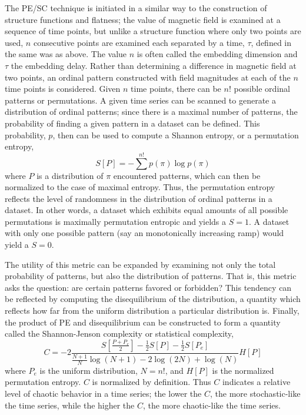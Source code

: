 \documentclass[aip,pop,amsmath,amssymb,preprint,superscriptaddress]{revtex4-1} %
\begin{document}
The PE/SC technique is initiated in a similar way to the construction of structure functions and flatness; the value of magnetic field is examined at a sequence of time points, but unlike a structure function where only two points are used, $n$ consecutive points are examined each separated by a time, $\tau$, defined in the same was as above. The value $n$ is often called the embedding dimension and $\tau$ the embedding delay. Rather than determining a difference in magnetic field at two points, an ordinal pattern constructed with field magnitudes at each of the $n$ time points is considered. Given $n$ time points, there can be $n!$ possible ordinal patterns or permutations. A given time series can be scanned to generate a distribution of ordinal patterns; since there is a maximal number of patterns, the probability of finding a given pattern in a dataset can be defined. This probability, $p$, then can be  used to compute a Shannon entropy, or a permutation entropy,
\begin{equation}
S[P]  = -\sum^{n!} p(\pi) \log p(\pi)
\label{eq:pe}
\end{equation}
where $P$ is a distribution of $\pi$ encountered patterns, which can then be normalized to the case of maximal entropy. Thus, the permutation entropy reflects the level of randomness in the distribution of ordinal patterns in a dataset. In other words, a dataset which exhibits equal amounts of all possible permutations is maximally permutation entropic and yields a $S = 1$. A dataset with only one possible pattern (say an monotonically increasing ramp) would yield a $S = 0$.

The utility of this metric can be expanded by examining not only the total probability of patterns, but also the distribution of patterns. That is, this metric asks the question: are certain patterns favored or forbidden? This tendency can be reflected by computing the disequilibrium of the distribution, a quantity which reflects how far from the uniform distribution a particular distribution is. Finally, the product of PE and disequilibrium can be constructed to form a quantity called the Shannon-Jenson complexity or statistical complexity, 
\begin{equation}
C = -2\frac{S \left[ \frac{P+P_e}{2} \right] - \frac{1}{2}S[P]-\frac{1}{2}S[P_e] }{\frac{N+1}{N} \log(N+1)-2 \log(2N)+\log(N)}H[P]
\label{eq:sc}
\end{equation}
where $P_e$ is the uniform distribution, $N=n!$, and $H[P]$ is the normalized permutation entropy. $C$ is normalized by definition.
Thus $C$ indicates a relative level of chaotic behavior in a time series; the lower the $C$, the more stochastic-like the time series, while the higher the $C$, the more chaotic-like the time series.
\end{document}
